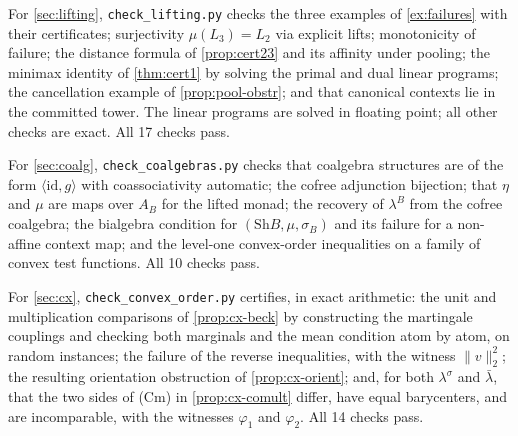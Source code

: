 \documentclass[11pt]{article}
\theoremstyle{definition}
\theoremstyle{remark}
\newcommand{\Sh}{\mathrm{Sh}}
\newcommand{\id}{\mathrm{id}}
\newcommand{\lb}{\bar\lambda}
\newcommand{\ls}{\lambda^{\sigma}}
\begin{document}
For \cref{sec:lifting}, \texttt{check\_lifting.py} checks the three examples of
\cref{ex:failures} with their certificates; surjectivity $\mu(L_3)=L_2$ via explicit lifts;
monotonicity of failure; the distance formula of \cref{prop:cert23} and its affinity under pooling;
the minimax identity of \cref{thm:cert1} by solving the primal and dual linear programs; the
cancellation example of \cref{prop:pool-obstr}; and that canonical contexts lie in the committed
tower. The linear programs are solved in floating point; all other checks are exact. All 17 checks
pass.

For \cref{sec:coalg}, \texttt{check\_coalgebras.py} checks that coalgebra structures are of the form
$\langle\id,g\rangle$ with coassociativity automatic; the cofree adjunction bijection; that $\eta$ and
$\mu$ are maps over $A_B$ for the lifted monad; the recovery of $\lambda^B$ from the cofree coalgebra;
the bialgebra condition for $(\Sh B,\mu,\sigma_B)$ and its failure for a non-affine context map; and
the level-one convex-order inequalities on a family of convex test functions. All 10 checks pass.

For \cref{sec:cx}, \texttt{check\_convex\_order.py} certifies, in exact arithmetic: the unit and
multiplication comparisons of \cref{prop:cx-beck} by constructing the martingale couplings and checking
both marginals and the mean condition atom by atom, on random instances; the failure of the reverse
inequalities, with the witness $\lVert v\rVert_2^2$; the resulting orientation obstruction of
\cref{prop:cx-orient}; and, for both $\ls$ and $\lb$, that the two sides of (Cm) in
\cref{prop:cx-comult} differ, have equal barycenters, and are incomparable, with the witnesses
$\varphi_1$ and $\varphi_2$. All 14 checks pass.
\end{document}
